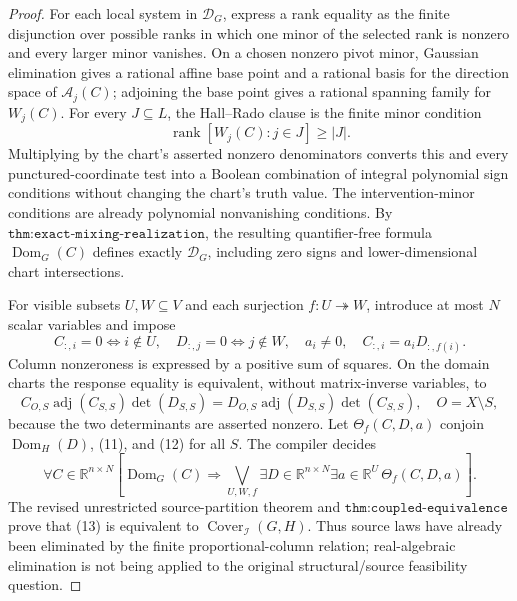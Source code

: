 \documentclass{article}
\begin{document}
\begin{proof}
For each local system in \(\mathcal D_G\), express a rank equality as the finite disjunction over possible ranks in which one minor of the selected rank is nonzero and every larger minor vanishes. On a chosen nonzero pivot minor, Gaussian elimination gives a rational affine base point and a rational basis for the direction space of \(\mathcal A_j(C)\); adjoining the base point gives a rational spanning family for \(W_j(C)\). For every \(J\subseteq L\), the Hall--Rado clause is the finite minor condition
\[
\operatorname{rank}[W_j(C):j\in J]\ge |J|.
\]
Multiplying by the chart's asserted nonzero denominators converts this and every punctured-coordinate test into a Boolean combination of integral polynomial sign conditions without changing the chart's truth value. The intervention-minor conditions are already polynomial nonvanishing conditions. By \(\texttt{thm:exact-mixing-realization}\), the resulting quantifier-free formula \(\operatorname{Dom}_G(C)\) defines exactly \(\mathcal D_G\), including zero signs and lower-dimensional chart intersections.

For visible subsets \(U,W\subseteq V\) and each surjection \(f:U\twoheadrightarrow W\), introduce at most \(N\) scalar variables and impose
\[
C_{:,i}=0\Longleftrightarrow i\notin U,
\quad D_{:,j}=0\Longleftrightarrow j\notin W,
\quad a_i\ne0,
\quad C_{:,i}=a_iD_{:,f(i)}. \tag{11}
\]
Column nonzeroness is expressed by a positive sum of squares. On the domain charts the response equality is equivalent, without matrix-inverse variables, to
\[
C_{O,S}\operatorname{adj}(C_{S,S})\det(D_{S,S})
=D_{O,S}\operatorname{adj}(D_{S,S})\det(C_{S,S}),
\quad O=X\setminus S, \tag{12}
\]
because the two determinants are asserted nonzero. Let \(\Theta_f(C,D,a)\) conjoin \(\operatorname{Dom}_H(D)\), (11), and (12) for all \(S\). The compiler decides
\[
\forall C\in\mathbb R^{n\times N}\left[
\operatorname{Dom}_G(C)\Longrightarrow
\bigvee_{U,W,f}\exists D\in\mathbb R^{n\times N}\exists a\in\mathbb R^U\,\Theta_f(C,D,a)
\right]. \tag{13}
\]
The revised unrestricted source-partition theorem and \(\texttt{thm:coupled-equivalence}\) prove that (13) is equivalent to \(\operatorname{Cover}_{\mathcal I}(G,H)\). Thus source laws have already been eliminated by the finite proportional-column relation; real-algebraic elimination is not being applied to the original structural/source feasibility question.


\end{proof}
\end{document}

